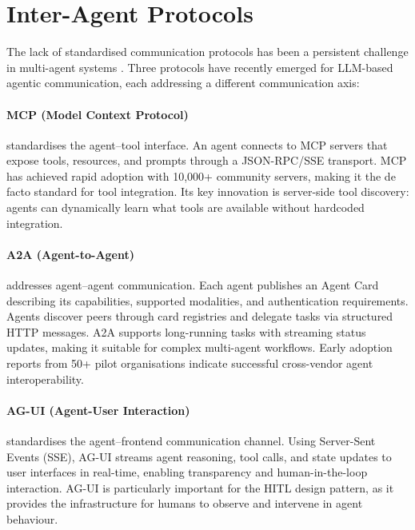 \documentclass[review]{elsarticle}
\theoremstyle{definition}
\begin{document}
\section{Inter-Agent Protocols}\label{sec:protocols}

The lack of standardised communication protocols has been a persistent challenge in multi-agent systems \citep{fipa2002acl,singh2005overview}. Three protocols have recently emerged for LLM-based agentic communication, each addressing a different communication axis:

\paragraph{MCP (Model Context Protocol)} \citep{anthropic2024mcp} standardises the agent--tool interface. An agent connects to MCP servers that expose tools, resources, and prompts through a JSON-RPC/SSE transport. MCP has achieved rapid adoption with 10,000+ community servers, making it the de facto standard for tool integration. Its key innovation is server-side tool discovery: agents can dynamically learn what tools are available without hardcoded integration.

\paragraph{A2A (Agent-to-Agent)} \citep{google2024a2a} addresses agent--agent communication. Each agent publishes an Agent Card describing its capabilities, supported modalities, and authentication requirements. Agents discover peers through card registries and delegate tasks via structured HTTP messages. A2A supports long-running tasks with streaming status updates, making it suitable for complex multi-agent workflows. Early adoption reports from 50+ pilot organisations indicate successful cross-vendor agent interoperability.

\paragraph{AG-UI (Agent-User Interaction)} \citep{copilotkit2024agui} standardises the agent--frontend communication channel. Using Server-Sent Events (SSE), AG-UI streams agent reasoning, tool calls, and state updates to user interfaces in real-time, enabling transparency and human-in-the-loop interaction. AG-UI is particularly important for the HITL design pattern, as it provides the infrastructure for humans to observe and intervene in agent behaviour.
\end{document}
